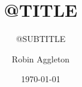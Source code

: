 \documentclass[10pt]{beamer}
\title{@TITLE}
\subtitle{@SUBTITLE}
\author[R. Aggleton]{Robin Aggleton}
\date{\today}
\begin{document}
\begin{frame}[fragile]
  \titlepage
\end{frame}



\end{document}

